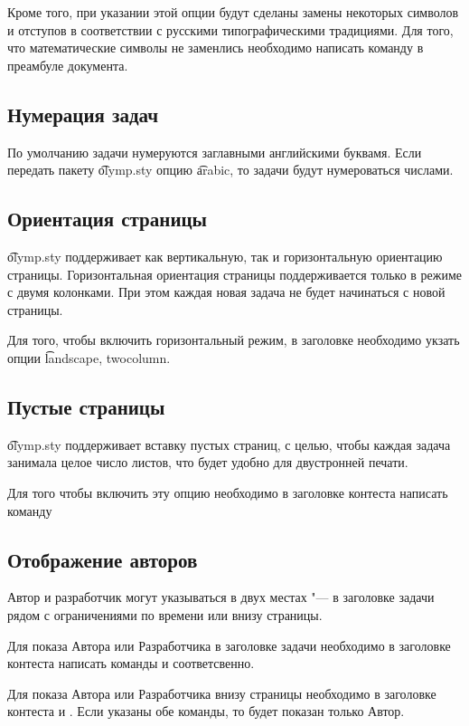 \documentclass[11pt,a4paper,oneside]{article}
\begin{document}
Кроме того, при указании этой опции будут сделаны замены некоторых
символов и отступов в соответствии с русскими типографическими традициями.
Для того, что математические символы не заменлись необходимо написать
команду  в преамбуле документа.

\subsection{Нумерация задач}

По умолчанию задачи нумеруются заглавными английскими буквамя. Если передать пакету 
\t{olymp.sty} опцию \t{arabic}, то задачи будут нумероваться числами.

\subsection{Ориентация страницы}

\t{olymp.sty} поддерживает как вертикальную, так и горизонтальную ориентацию страницы.
Горизонтальная ориентация страницы поддерживается только в режиме с двумя колонками.
При этом каждая новая задача не будет начинаться с новой страницы.

Для того, чтобы включить горизонтальный режим, в заголовке 
необходимо укзать опции \t{landscape, twocolumn}.

\subsection{Пустые страницы}
\t{olymp.sty} поддерживает вставку пустых страниц, с целью, чтобы каждая задача занимала
целое число листов, что будет удобно для двустронней печати.

Для того чтобы включить эту опцию необходимо в заголовке контеста написать команду

\subsection{Отображение авторов}
Автор и разработчик могут указываться в двух местах "--- в заголовке задачи
рядом с ограничениями по времени или внизу страницы.

Для показа Автора или Разработчика в заголовке задачи необходимо в заголовке контеста 
написать команды 
 и
 соответсвенно.

Для показа Автора или Разработчика внизу страницы необходимо в заголовке контеста 
 и . 
Если указаны обе команды, то будет показан только Автор.
\end{document}
